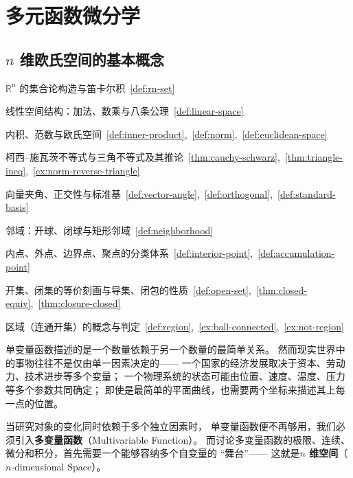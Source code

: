 \documentclass[lang=cn,11pt]{elegantbook}
\begin{document}
\chapter{多元函数微分学}



\section{$n$ 维欧氏空间的基本概念}

\begin{introduction}
  \item $\mathbb{R}^n$ 的集合论构造与笛卡尔积~\ref{def:rn-set}
  \item 线性空间结构：加法、数乘与八条公理~\ref{def:linear-space}
  \item 内积、范数与欧氏空间~\ref{def:inner-product},~\ref{def:norm},~\ref{def:euclidean-space}
  \item 柯西--施瓦茨不等式与三角不等式及其推论~\ref{thm:cauchy-schwarz},~\ref{thm:triangle-ineq},~\ref{ex:norm-reverse-triangle}
  \item 向量夹角、正交性与标准基~\ref{def:vector-angle},~\ref{def:orthogonal},~\ref{def:standard-basis}
  \item 邻域：开球、闭球与矩形邻域~\ref{def:neighborhood}
  \item 内点、外点、边界点、聚点的分类体系~\ref{def:interior-point},~\ref{def:accumulation-point}
  \item 开集、闭集的等价刻画与导集、闭包的性质~\ref{def:open-set},~\ref{thm:closed-equiv},~\ref{thm:closure-closed}
  \item 区域（连通开集）的概念与判定~\ref{def:region},~\ref{ex:ball-connected},~\ref{ex:not-region}
\end{introduction}

单变量函数描述的是一个数量依赖于另一个数量的最简单关系。
然而现实世界中的事物往往不是仅由单一因素决定的——
一个国家的经济发展取决于资本、劳动力、技术进步等多个变量；
一个物理系统的状态可能由位置、速度、温度、压力等多个参数共同确定；
即使是最简单的平面曲线，也需要两个坐标来描述其上每一点的位置。

当研究对象的变化同时依赖于多个独立因素时，
单变量函数便不再够用，我们必须引入\textbf{多变量函数}（Multivariable Function）。
而讨论多变量函数的极限、连续、微分和积分，首先需要一个能够容纳多个自变量的 ``舞台''——
这就是\textbf{$n$ 维空间}（$n$-dimensional Space）。
\end{document}
